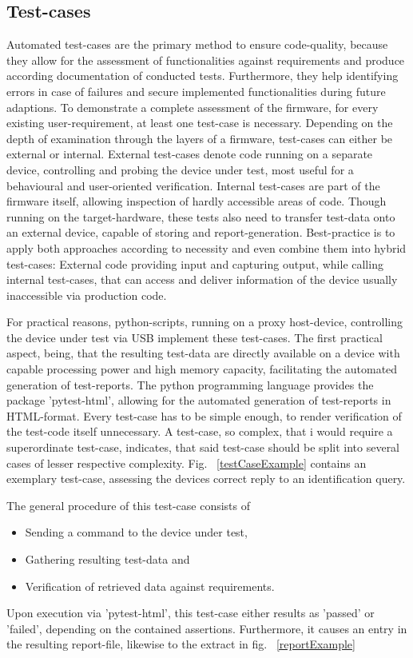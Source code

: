 \documentclass[master,english,smartquotes,apa]{hgbthesis}
\begin{document}
			\subsection{Test-cases}
			Automated test-cases are the primary method to ensure code-quality, because they allow for the assessment of functionalities against requirements and produce according documentation of conducted tests. Furthermore, they help identifying  errors in case of failures and secure implemented functionalities during future adaptions. To demonstrate a complete assessment of the firmware, for every existing user-requirement, at least one test-case is necessary. Depending on the depth of examination through the layers of a firmware, test-cases can either be external or internal. External test-cases denote code running on a separate device, controlling and probing the device under test, most useful for a behavioural and user-oriented verification. Internal test-cases are part of the firmware itself, allowing inspection of hardly accessible areas of code. Though running on the target-hardware, these tests also need to transfer test-data onto an external device, capable of storing and report-generation. Best-practice is to apply both approaches according to necessity and even combine them into hybrid test-cases: External code providing input and capturing output, while calling internal test-cases, that can access and deliver information of the device usually inaccessible via production code.
			
			For practical reasons, python-scripts, running on a proxy host-device, controlling the device under test via USB implement these test-cases. The first practical aspect, being, that the resulting test-data are directly available on a device with capable processing power and high memory capacity, facilitating the automated generation of test-reports. The python programming language provides the package 'pytest-html', allowing for the automated generation of test-reports in HTML-format. Every test-case has to be simple enough, to render verification of the test-code itself unnecessary. A test-case, so complex, that i would require a superordinate test-case, indicates, that said test-case should be split into several cases of lesser respective complexity. Fig. ~\ref{testCaseExample} contains an exemplary test-case, assessing the devices correct reply to an identification query. \cite{BalajiScpi}
			
			The general procedure of this test-case consists of 
			\begin{itemize} \setlength\itemsep{1px}
			\item Sending a command to the device under test,
			\item Gathering resulting test-data and
			\item Verification of retrieved data against requirements.
			\end{itemize}
			Upon execution via 'pytest-html', this test-case either results as 'passed' or 'failed', depending on the contained assertions. Furthermore, it causes an entry in the resulting report-file, likewise to the extract in fig. ~\ref{reportExample}
			
\end{document}
